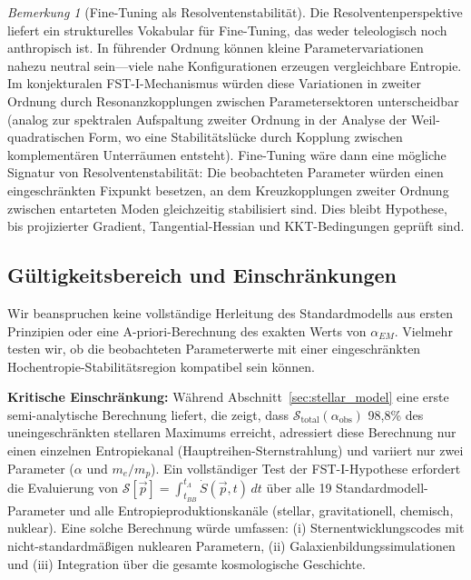 \documentclass[12pt,a4paper]{article}
\theoremstyle{remark}
\newtheorem{remark}{Bemerkung}
\begin{document}
\begin{remark}[Fine-Tuning als Resolventenstabilit\"at]
\label{rem:fine-tuning-resolvent}
Die Resolventenperspektive \citep{GeigerRH2026b} liefert ein strukturelles Vokabular f\"ur Fine-Tuning, das weder teleologisch noch anthropisch ist. In f\"uhrender Ordnung k\"onnen kleine Parametervariationen nahezu neutral sein---viele nahe Konfigurationen erzeugen vergleichbare Entropie. Im konjekturalen FST-I-Mechanismus w\"urden diese Variationen in zweiter Ordnung durch Resonanzkopplungen zwischen Parametersektoren unterscheidbar (analog zur spektralen Aufspaltung zweiter Ordnung in der Analyse der Weil-quadratischen Form, wo eine Stabilit\"atsl\"ucke durch Kopplung zwischen komplement\"aren Unterr\"aumen entsteht). Fine-Tuning w\"are dann eine m\"ogliche Signatur von Resolventenstabilit\"at: Die beobachteten Parameter w\"urden einen eingeschr\"ankten Fixpunkt besetzen, an dem Kreuzkopplungen zweiter Ordnung zwischen entarteten Moden gleichzeitig stabilisiert sind. Dies bleibt Hypothese, bis projizierter Gradient, Tangential-Hessian und KKT-Bedingungen gepr\"uft sind.
\end{remark}

\subsection{G\"ultigkeitsbereich und Einschr\"ankungen}

Wir beanspruchen keine vollst\"andige Herleitung des Standardmodells aus ersten Prinzipien oder eine A-priori-Berechnung des exakten Werts von $\alpha_{EM}$. Vielmehr testen wir, ob die beobachteten Parameterwerte mit einer eingeschr\"ankten Hochentropie-Stabilit\"atsregion kompatibel sein k\"onnen.

\textbf{Kritische Einschr\"ankung:} W\"ahrend Abschnitt~\ref{sec:stellar_model} eine erste semi-analytische Berechnung liefert, die zeigt, dass $\mathcal{S}_{\text{total}}(\alpha_{\text{obs}})$ 98,8\% des uneingeschr\"ankten stellaren Maximums erreicht, adressiert diese Berechnung nur einen einzelnen Entropiekanal (Hauptreihen-Sternstrahlung) und variiert nur zwei Parameter ($\alpha$ und $m_e/m_p$). Ein vollst\"andiger Test der FST-I-Hypothese erfordert die Evaluierung von $\mathcal{S}[\vec{p}] = \int_{t_{BB}}^{t_\Lambda} \dot{S}(\vec{p}, t)\,dt$ \"uber alle 19 Standardmodell-Parameter und alle Entropieproduktionskan\"ale (stellar, gravitationell, chemisch, nuklear). Eine solche Berechnung w\"urde umfassen: (i) Sternentwicklungscodes mit nicht-standardm\"a\ss{}igen nuklearen Parametern, (ii) Galaxienbildungssimulationen und (iii) Integration \"uber die gesamte kosmologische Geschichte.
\end{document}
